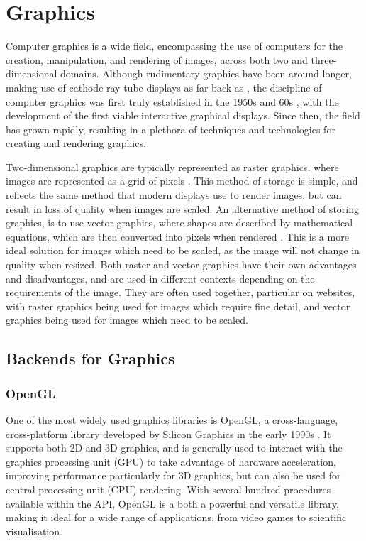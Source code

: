 \documentclass[../main.tex]{subfiles}
\begin{document}
    \section{Graphics}
        Computer graphics is a wide field, encompassing the use of computers for the
            creation, manipulation, and rendering of images, across both two and
            three-dimensional domains.
        Although rudimentary graphics have been around longer, making use of cathode
            ray tube displays as far back as \citet{crtBraun}, the discipline of computer
            graphics was first truly established in the 1950s and 60s \citep{graphics},
            with the development of the first viable interactive graphical displays.
        Since then, the field has grown rapidly, resulting in a plethora of techniques
            and technologies for creating and rendering graphics.

        Two-dimensional graphics are typically represented as raster graphics, where
            images are represented as a grid of pixels \citep{rasterGraphics}.
        This method of storage is simple, and reflects the same method that modern
            displays use to render images, but can result in loss of quality when images
            are scaled.
        An alternative method of storing graphics, is to use vector graphics, where
            shapes are described by mathematical equations, which are then converted into
            pixels when rendered \citep{vectorGraphics}.
        This is a more ideal solution for images which need to be scaled, as the image
            will not change in quality when resized.
        Both raster and vector graphics have their own advantages and disadvantages,
            and are used in different contexts depending on the requirements of the image.
        They are often used together, particular on websites, with raster graphics
            being used for images which require fine detail, and vector graphics being used
            for images which need to be scaled.

        \subsection{Backends for Graphics}
            \subsubsection{OpenGL}
                One of the most widely used graphics libraries is OpenGL, a cross-language,
                    cross-platform library developed by Silicon Graphics in the early 1990s
                    \citep{openGL}.
                It supports both 2D and 3D graphics, and is generally used to interact with the
                    graphics processing unit (GPU) to take advantage of hardware acceleration,
                    improving performance particularly for 3D graphics, but can also be used for
                    central processing unit (CPU) rendering.
                With several hundred procedures available within the API, OpenGL is a both a
                    powerful and versatile library, making it ideal for a wide range of
                    applications, from video games to scientific visualisation.
\end{document}
